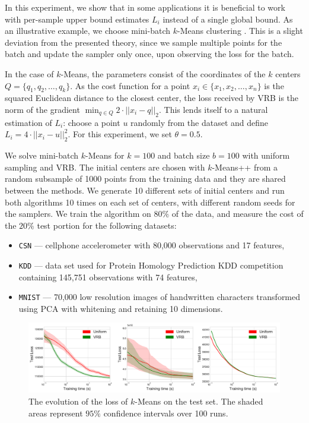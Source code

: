 In this experiment, we show that in some applications it is beneficial to work with per-sample upper bound estimates $L_i$ instead of a single global bound. As an illustrative example, we choose mini-batch $k$-Means clustering \citep{sculley2010web}. This is a slight deviation from the presented theory, since we sample multiple points for the batch and update the sampler only  once, upon observing the loss for the batch. 

In the case of $k$-Means, the parameters consist of the coordinates of the $k$ centers \linebreak $Q=\{q_1, q_2, \dots, q_k\}$. As the cost function for a point $x_i \in \{x_1, x_2, \dots, x_n \}$ is the  squared Euclidean distance to the closest center, the loss received by VRB  is the norm of the gradient  \linebreak $\min _{q \in Q } 2 \cdot || x_i - q||_2$. This lends itself to a natural estimation of $L_i$:
choose a point $u$ randomly from the dataset and define $L_i=4 \cdot || x_i - u||^2_2$. For this experiment, we set $\theta=0.5$.

We solve mini-batch $k$-Means  for $k=100$ and batch size $b=100$ with uniform sampling and VRB. The initial centers are chosen with $k$-Means++ \citep{arthur2007k} from a random subsample of 1000 points from the training data and they are shared between the methods. We generate 10 different sets of initial centers and run both algorithms 10 times on each set of centers, with different random seeds for the samplers.  We train the algorithm on $80 \%$ of the data, and measure the cost of the $20 \%$ test portion for the following datasets:
\vspace{-2mm}
\begin{itemize}
\setlength\itemsep{0.2em}
  \item \texttt{CSN} \citep{faulkner2011next} --- cellphone accelerometer with 80,000 observations and 17 features,
 \item \texttt{KDD} \citep{kddcup2004} --- data set used for Protein Homology Prediction KDD
    competition  containing 145,751 observations with 74 features,
    \item \texttt{MNIST} \citep{lecun1998gradient} --- 70,000 low resolution images of handwritten
    characters transformed using PCA with whitening and retaining 10 dimensions.  
\end{itemize}

\begin{figure}[h]
      \centering
      \includegraphics[width=\linewidth]{figures/kmeans.pdf}
      \caption{The evolution of the loss of $k$-Means on the test set. The shaded areas represent $95\%$ confidence intervals over 100 runs.}
      \label{fig:kmeans-results}
        \end{figure}
        
